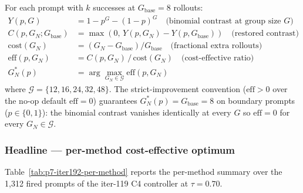 \documentclass{article}
\begin{document}
For each prompt with $k$ successes at $G_{\mathrm{base}}{=}8$ rollouts:
\begin{align}
Y(p, G) &= 1 - p^G - (1-p)^G \quad\text{(binomial contrast at group size $G$)}\\
C(p, G_N; G_{\mathrm{base}}) &= \max(0,\, Y(p, G_N) - Y(p, G_{\mathrm{base}}))\quad\text{(restored contrast)}\\
\mathrm{cost}(G_N) &= (G_N - G_{\mathrm{base}}) / G_{\mathrm{base}}\quad\text{(fractional extra rollouts)}\\
\mathrm{eff}(p, G_N) &= C(p, G_N) \,/\, \mathrm{cost}(G_N)\quad\text{(cost-effective ratio)}\\
G_N^*(p) &= \arg\max_{G_N \in \mathcal{G}} \mathrm{eff}(p, G_N)
\label{eq:iter192-eff}
\end{align}
where $\mathcal{G} = \{12, 16, 24, 32, 48\}$. The strict-improvement
convention ($\mathrm{eff} > 0$ over the no-op default
$\mathrm{eff}=0$) guarantees $G_N^*(p) = G_{\mathrm{base}}{=}8$ on
boundary prompts ($p \in \{0, 1\}$): the binomial contrast vanishes
identically at every $G$ so $\mathrm{eff} = 0$ for every $G_N \in
\mathcal{G}$.

\subsubsection*{Headline --- per-method cost-effective optimum}

Table~\ref{tab:p7-iter192-per-method} reports the per-method summary
over the 1,312 fired prompts of the iter-119 C4 controller at
$\tau = 0.70$.
\end{document}

